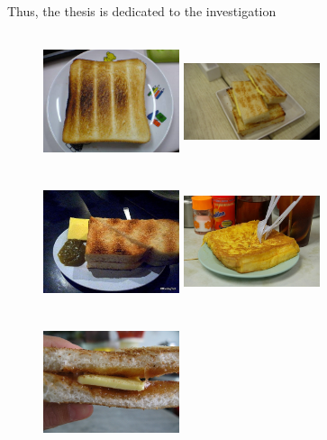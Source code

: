 Thus, the thesis is dedicated to the investigation 

\begin{figure}
    \centering
    \includegraphics[height=4cm, width=4cm]{img/kaya_toast_1.jpg}
    \includegraphics[height=4cm, width=4cm]{img/kaya_toast_2.jpg}
    \includegraphics[height=4cm, width=4cm]{img/kaya_toast_3.jpg}
    \includegraphics[height=4cm, width=4cm]{img/kaya_toast_4.jpg}
    \includegraphics[height=4cm, width=4cm]{img/kaya_toast_5.jpg}

\end{figure}
